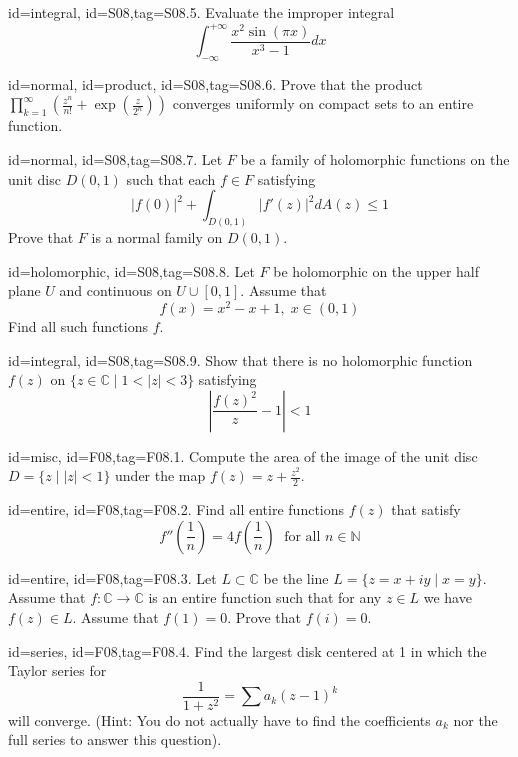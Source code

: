 \documentclass[12pt,letterpaper]{article}
\begin{document}
{\item[id=integral, id=S08,tag=S08.5.]
Evaluate the improper integral
\[
	\int_{-\infty}^{+\infty} \frac{x^2 \sin(\pi x)}{x^3 - 1} dx
\]

\item[id=normal, id=product, id=S08,tag=S08.6.]
Prove that the product $\prod_{k=1}^{\infty}\left(\frac{z^n}{n!} + \exp(\frac{z}{2^n}) \right)$ converges uniformly on compact sets to an entire function.

\item[id=normal, id=S08,tag=S08.7.]
Let $F$ be a family of holomorphic functions on the unit disc $D(0,1)$ such that each $f \in F$ satisfying
\[
	| f(0) |^2 + \int_{D(0,1)} | f'(z) |^2 dA(z) \le 1
\]
Prove that $F$ is a normal family on $D(0,1)$.

\item[id=holomorphic, id=S08,tag=S08.8.]
Let $F$ be holomorphic on the upper half plane $U$ and continuous on $U \cup [0,1]$. Assume that
\[
	f(x) = x^2 - x + 1, \; x \in (0,1)
\]
Find all such functions $f$.

\item[id=integral, id=S08,tag=S08.9.]
Show that there is no holomorphic function $f(z)$ on $\{z \in \mathbb{C} \mid 1 < | z | < 3\}$ satisfying
\[
	\left| \frac{f(z)^2}{z} - 1 \right| < 1
\]


\item[id=misc, id=F08,tag=F08.1.]
Compute the area of the image of the unit disc $D = \{z \mid | z | < 1\}$ under the map $f(z) = z + \frac{z^2}{2}$.
\item[id=entire, id=F08,tag=F08.2.]
Find all entire functions $f(z)$ that satisfy
\[
	f''\left(\frac{1}{n}\right) = 4f\left(\frac{1}{n}\right) \; \text{ for all } n \in \mathbb{N}
\]

\item[id=entire, id=F08,tag=F08.3.]
Let $L \subset \mathbb{C}$ be the line $L = \{z = x + iy \mid x = y\}$. Assume that $f : \mathbb{C} \rightarrow \mathbb{C}$ is an entire function such that for any $z \in L$ we have $f(z) \in L$. Assume that $f(1) = 0$. Prove that $f(i) = 0$.

\item[id=series, id=F08,tag=F08.4.]
Find the largest disk centered at 1 in which the Taylor series for
\[
	\frac{1}{1+z^2} = \sum a_k(z-1)^k
\]
will converge. (Hint: You do not actually have to find the coefficients $a_k$ nor the full series to answer this question).

}
\end{document}
